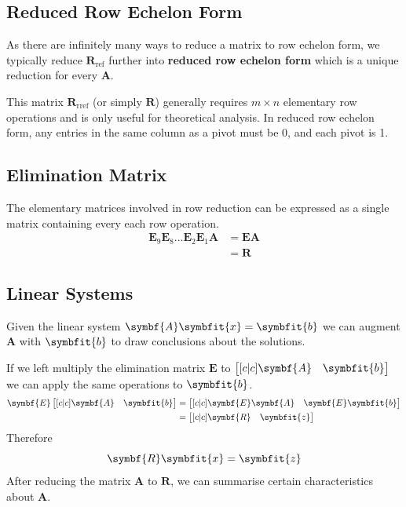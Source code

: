 \documentclass{article}
\begin{document}
\subsection{Reduced Row Echelon Form}
As there are infinitely many ways to reduce a matrix to row echelon form, we typically
reduce \(\symbf{R}_{\mathrm{ref}}\) further into \textbf{reduced row echelon form} which is
a unique reduction for every \(\symbf{A}\).

This matrix \(\symbf{R}_{\mathrm{rref}}\) (or simply \(\symbf{R}\)) generally requires \(m \times n\)
elementary row operations and is only useful for theoretical analysis.
In reduced row echelon form, any entries in the same column as a pivot must be 0, and each pivot is 1.
\subsection{Elimination Matrix}
The elementary matrices involved in row reduction can be expressed as a single matrix containing every
each row operation.
\begin{align*}
    \symbf{E}_9 \symbf{E}_8 \dots \symbf{E}_2 \symbf{E}_1 \symbf{A} & = \symbf{E} \symbf{A} \\
                                                                    & = \symbf{R}
\end{align*}
\subsection{Linear Systems}
Given the linear system \(\symbf{A} \symbfit{x} = \symbfit{b}\)
we can augment \(\symbf{A}\) with \(\symbfit{b}\) to draw conclusions about the solutions.

If we left multiply the elimination matrix \(\symbf{E}\) to
\(\begin{bmatrix}[c|c]
    \symbf{A} & \symbfit{b}
\end{bmatrix}\)
we can apply the same operations to \(\symbfit{b}\).
\begin{align*}
    \symbf{E}
    \begin{bmatrix}[c|c]
        \symbf{A} & \symbfit{b}
    \end{bmatrix} & =
    \begin{bmatrix}[c|c]
        \symbf{E} \symbf{A} & \symbf{E} \symbfit{b}
    \end{bmatrix}          \\
                             & = \begin{bmatrix}[c|c]
                                     \symbf{R} & \symbfit{z}
                                 \end{bmatrix}
\end{align*}
Therefore
\begin{equation*}
    \symbf{R} \symbfit{x} = \symbfit{z}
\end{equation*}
After reducing the matrix \(\symbf{A}\) to \(\symbf{R}\), we can summarise
certain characteristics about \(\symbf{A}\).
\end{document}
